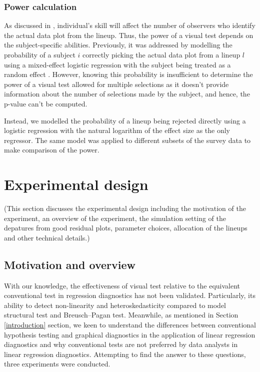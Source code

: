 \documentclass[]{interact}
\theoremstyle{plain}%
\theoremstyle{definition}
\theoremstyle{remark}
\begin{document}
\hypertarget{power-calculation}{%
\subsubsection{Power calculation}\label{power-calculation}}

As discussed in \citet{majumder_validation_2013}, individual's skill
will affect the number of observers who identify the actual data plot
from the lineup. Thus, the power of a visual test depends on the
subject-specific abilities. Previously, it was addressed by modelling
the probability of a subject \(i\) correctly picking the actual data
plot from a lineup \(l\) using a mixed-effect logistic regression with
the subject being treated as a random effect
\citep{majumder_validation_2013}. However, knowing this probability is
insufficient to determine the power of a visual test allowed for
multiple selections as it doesn't provide information about the number
of selections made by the subject, and hence, the p-value can't be
computed.

Instead, we modelled the probability of a lineup being rejected directly
using a logistic regression with the natural logarithm of the effect
size as the only regressor. The same model was applied to different
subsets of the survey data to make comparison of the power.

\hypertarget{experimental-design}{%
\section{Experimental design}\label{experimental-design}}

(This section discusses the experimental design including the motivation
of the experiment, an overview of the experiment, the simulation setting
of the depatures from good residual plots, parameter choices, allocation
of the lineups and other technical details.)

\hypertarget{motivation-and-overview}{%
\subsection{Motivation and overview}\label{motivation-and-overview}}

With our knowledge, the effectiveness of visual test relative to the
equivalent conventional test in regression diagnostics has not been
validated. Particularly, its ability to detect non-linearity and
heteroskedasticity compared to model structural test and Breusch--Pagan
test. Meanwhile, as mentioned in Section \ref{introduction} section, we
keen to understand the differences between conventional hypothesis
testing and graphical diagnostics in the application of linear
regression diagnostics and why conventional tests are not preferred by
data analysts in linear regression diagnostics. Attempting to find the
answer to these questions, three experiments were conducted.
\end{document}
